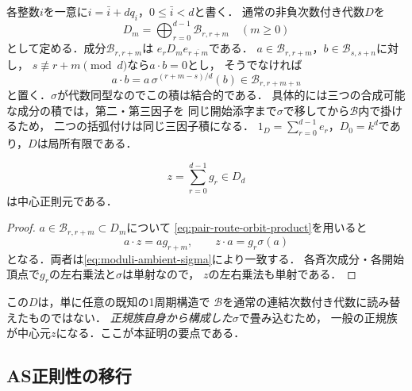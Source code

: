 各整数$i$を一意に$i=\bar i+dq_i$，$0\leq\bar i<d$と書く．
通常の非負次数付き代数$D$を
\begin{equation}\label{eq:pair-route-orbit-space}
 D_m=\bigoplus_{r=0}^{d-1}\mathcal B_{r,r+m}\quad(m\geq0)
\end{equation}
として定める．成分$\mathcal B_{r,r+m}$は
$e_rD_me_{\overline{r+m}}$である．
$a\in\mathcal B_{r,r+m}$，$b\in\mathcal B_{s,s+n}$に対し，
$s\not\equiv r+m\pmod d$なら$a\cdot b=0$とし，
そうでなければ
\begin{equation}\label{eq:pair-route-orbit-product}
 a\cdot b=a\,\sigma^{(r+m-s)/d}(b)
   \in\mathcal B_{r,r+m+n}
\end{equation}
と置く．$\sigma$が代数同型なのでこの積は結合的である．
具体的には三つの合成可能な成分の積では，第二・第三因子を
同じ開始添字まで$\sigma$で移してから$\mathcal B$内で掛けるため，
二つの括弧付けは同じ三因子積になる．
$1_D=\sum_{r=0}^{d-1}e_r$，$D_0=k^d$であり，$D$は局所有限である．

\begin{lemma}[orbit内の中心元]\label{lem:pair-route-orbit-center}
\begin{equation}\label{eq:pair-route-central-z}
 z=\sum_{r=0}^{d-1}g_r\in D_d
\end{equation}
は中心正則元である．
\end{lemma}
\begin{proof}
$a\in\mathcal B_{r,r+m}\subset D_m$について
\eqref{eq:pair-route-orbit-product}を用いると
\begin{equation}
 a\cdot z=ag_{r+m},\qquad
 z\cdot a=g_r\sigma(a)
\end{equation}
となる．両者は\eqref{eq:moduli-ambient-sigma}により一致する．
各斉次成分・各開始頂点で$g_r$の左右乗法と$\sigma$は単射なので，
$z$の左右乗法も単射である．
\end{proof}

この$D$は，単に任意の既知の1周期構造で
$\mathcal B$を通常の連結次数付き代数に読み替えたものではない．
\emph{正規族自身から構成した}$\sigma$で畳み込むため，
一般の正規族が中心元$z$になる．ここが本証明の要点である．

\subsection{AS正則性の移行}

